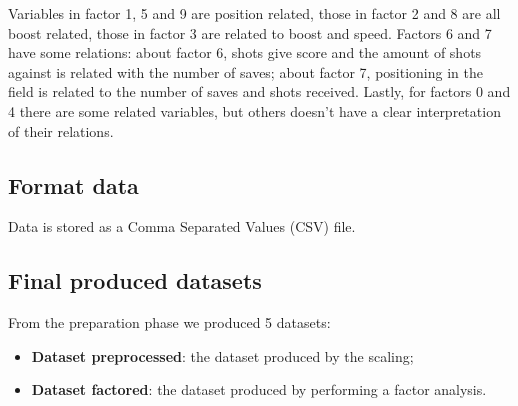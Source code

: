 Variables in factor 1, 5 and 9 are position related, those in factor 2 and 8 are all boost related, those in factor 3 are related to boost and speed. Factors 6 and 7 have some relations: about factor 6, shots give score and the amount of shots against is related with the number of saves; about factor 7, positioning in the field is related to the number of saves and shots received. Lastly, for factors 0 and 4 there are some related variables, but others doesn't have a clear interpretation of their relations.

\subsection{Format data}

Data is stored as a Comma Separated Values (CSV) file.

\subsection{Final produced datasets}

From the preparation phase we produced 5 datasets:

\begin{itemize}
    \item \textbf{Dataset preprocessed}: the dataset produced by the scaling;
    \item \textbf{Dataset factored}: the dataset produced by performing a factor analysis.
\end{itemize}